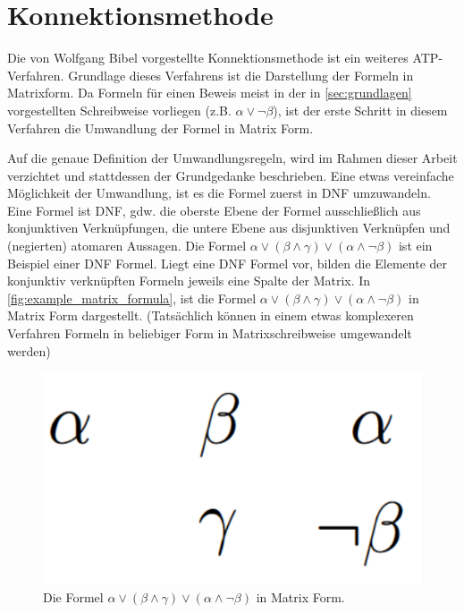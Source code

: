 \section{Konnektionsmethode}
Die von Wolfgang Bibel vorgestellte Konnektionsmethode ist ein weiteres ATP-Verfahren. \cite{atp_bibel} Grundlage dieses Verfahrens ist die Darstellung der Formeln in Matrixform. Da Formeln für einen Beweis meist in der in \autoref{sec:grundlagen} vorgestellten Schreibweise vorliegen (z.B. $\alpha\vee\neg\beta$), ist der erste Schritt in diesem Verfahren die Umwandlung der Formel in Matrix Form.

Auf die genaue Definition der Umwandlungsregeln, wird im Rahmen dieser Arbeit verzichtet und stattdessen der Grundgedanke beschrieben. Eine etwas vereinfache Möglichkeit der Umwandlung, ist es die Formel zuerst in \ac{DNF} umzuwandeln. Eine Formel ist \ac{DNF}, gdw. die oberste Ebene der Formel ausschließlich aus konjunktiven Verknüpfungen, die untere Ebene aus disjunktiven Verknüpfen und (negierten) atomaren Aussagen. Die Formel $\alpha\vee(\beta\wedge\gamma)\vee(\alpha\wedge\neg\beta)$ ist ein Beispiel einer \ac{DNF} Formel. Liegt eine \ac{DNF} Formel vor, bilden die Elemente der konjunktiv verknüpften Formeln jeweils eine Spalte der Matrix. In \autoref{fig:example_matrix_formula}, ist die Formel $\alpha\vee(\beta\wedge\gamma)\vee(\alpha\wedge\neg\beta)$ in Matrix Form dargestellt. (Tatsächlich können in einem etwas komplexeren Verfahren Formeln in beliebiger Form in Matrixschreibweise umgewandelt werden)

\begin{figure}[H]
\begin{center}
\includegraphics[scale=0.5]{images/example_matrix_formula.png}
\caption{Die Formel $\alpha\vee(\beta\wedge\gamma)\vee(\alpha\wedge\neg\beta)$ in Matrix Form.}
\label{fig:example_matrix_formula}
\end{center}
\end{figure}

